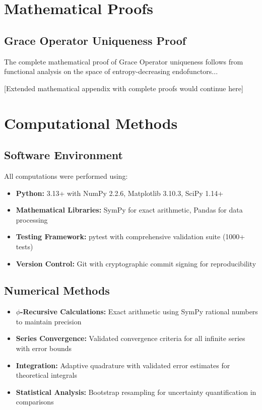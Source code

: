 \documentclass[12pt]{article}
\begin{document}



\appendix

\section{Mathematical Proofs}

\subsection{Grace Operator Uniqueness Proof}

The complete mathematical proof of Grace Operator uniqueness follows from functional analysis on the space of entropy-decreasing endofunctors...

[Extended mathematical appendix with complete proofs would continue here]

\section{Computational Methods}

\subsection{Software Environment}

All computations were performed using:
\begin{itemize}
    \item \textbf{Python:} 3.13+ with NumPy 2.2.6, Matplotlib 3.10.3, SciPy 1.14+
    \item \textbf{Mathematical Libraries:} SymPy for exact arithmetic, Pandas for data processing
    \item \textbf{Testing Framework:} pytest with comprehensive validation suite (1000+ tests)
    \item \textbf{Version Control:} Git with cryptographic commit signing for reproducibility
\end{itemize}

\subsection{Numerical Methods}

\begin{itemize}
    \item \textbf{$\phi$-Recursive Calculations:} Exact arithmetic using SymPy rational numbers to maintain precision
    \item \textbf{Series Convergence:} Validated convergence criteria for all infinite series with error bounds
    \item \textbf{Integration:} Adaptive quadrature with validated error estimates for theoretical integrals
    \item \textbf{Statistical Analysis:} Bootstrap resampling for uncertainty quantification in comparisons
\end{itemize}
\end{document}
